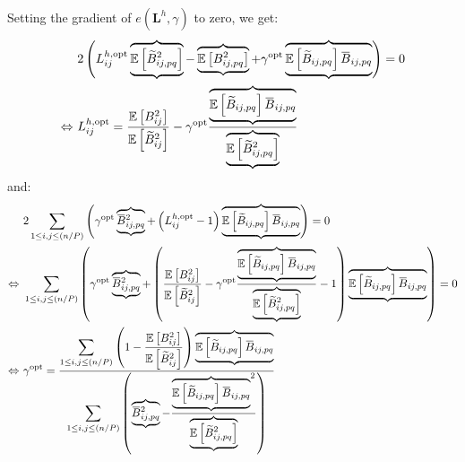 \documentclass[12pt]{scrartcl}
\newcommand{\overbar}[1]{\mkern 1.5mu\overline{\mkern-1.5mu#1\mkern-1.5mu}\mkern 1.5mu}
\begin{document}
Setting the gradient of $e(\mathbf{L}^h,\gamma)$ to zero, we get:
\begin{align}
\label{eq:hyb_th_com}
& 2 \left(L^{h,\mathrm{opt}}_{ij} \underbrace{\overbrace{\mathbb{E} \left[\widetilde{B}_{ij,pq}^2\right]}} - \underbrace{\overbrace{\mathbb{E} \left[B^2_{ij,pq}\right]}} + \gamma^\mathrm{opt} \underbrace{\overbrace{\mathbb{E} \left[\widetilde{B}_{ij,pq}\right] \overbar{B}_{ij,pq}}} \right) = 0 \nonumber \\
\Leftrightarrow \ & L^{h,\mathrm{opt}}_{ij} = \frac{\mathbb{E} \left[B^2_{ij}\right]}{\mathbb{E} \left[\widetilde{B}_{ij}^2\right]} - \gamma^\mathrm{opt} \frac{\displaystyle \underbrace{\overbrace{\mathbb{E} \left[\widetilde{B}_{ij,pq}\right] \overbar{B}_{ij,pq}}}}{\displaystyle \underbrace{\overbrace{\mathbb{E} \left[\widetilde{B}_{ij,pq}^2\right]}}}
\end{align}
and:
\begin{align}
\label{eq:betac2_com}
& 2 \sum_{1 \le i,j \le (n/P)} \left(\gamma^\mathrm{opt} \underbrace{\overbrace{\overbar{B}_{ij,pq}^2}} + \left(L^{h,\mathrm{opt}}_{ij} - 1\right) \underbrace{\overbrace{\mathbb{E} \left[\widetilde{B}_{ij,pq}\right] \overbar{B}_{ij,pq}}} \right) = 0 \nonumber \\
\Leftrightarrow \ & \sum_{1 \le i,j \le (n/P)} \left(\gamma^\mathrm{opt} \underbrace{\overbrace{\overbar{B}_{ij,pq}^2}} + \left(\frac{\mathbb{E} \left[B^2_{ij}\right]}{\mathbb{E} \left[\widetilde{B}_{ij}^2\right]} - \gamma^\mathrm{opt} \frac{\displaystyle \underbrace{\overbrace{\mathbb{E} \left[\widetilde{B}_{ij,pq}\right] \overbar{B}_{ij,pq}}}}{\displaystyle \underbrace{\overbrace{\mathbb{E} \left[\widetilde{B}_{ij,pq}^2\right]}}} - 1\right) \underbrace{\overbrace{\mathbb{E} \left[\widetilde{B}_{ij,pq}\right] \overbar{B}_{ij,pq}}} \right) = 0 \nonumber \\
\Leftrightarrow \ & \gamma^\mathrm{opt} = \frac{\displaystyle \sum_{1 \le i,j \le (n/P)} \left(1 - \frac{\mathbb{E} \left[B^2_{ij}\right]}{\mathbb{E} \left[\widetilde{B}_{ij}^2\right]}\right) \underbrace{\overbrace{\mathbb{E}\left[ \widetilde{B}_{ij,pq}\right] \overbar{B}_{ij,pq}}}}{\displaystyle \sum_{1 \le i,j \le (n/P)} \left(\underbrace{\overbrace{\overbar{B}_{ij,pq}^2}} - \frac{\displaystyle {\underbrace{\overbrace{\mathbb{E} \left[\widetilde{B}_{ij,pq}\right] \overbar{B}_{ij,pq}}}}^2}{\displaystyle \underbrace{\overbrace{\mathbb{E} \left[\widetilde{B}_{ij,pq}^2\right]}}}\right)}
\end{align}
\end{document}
